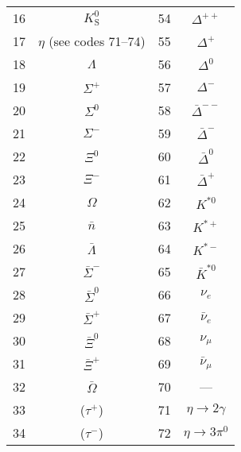 {\begin{table}[htb]
\begin{center}
\begin{tabular}{rc|rc}
       16 & $K^0_{\text{S}}$ &                       54 & $\Delta^{++}$ \\                         
       17 & $\eta$ (see codes 71--74) &              55 & $\Delta^+$ \\                            
       18 & $\Lambda$ &                              56 & $\Delta^0$ \\                            
       19 & $\Sigma^+$ &                             57 & $\Delta^-$ \\                            
       20 & $\Sigma^0$ &                             58 & $\bar{\Delta}^{--}$ \\                   
       21 & $\Sigma^-$ &                             59 & $\bar{\Delta}^-$ \\                      
       22 & $\Xi^0$ &                                60 & $\bar{\Delta}^0$ \\                      
       23 & $\Xi^-$ &                                61 & $\bar{\Delta}^+$ \\                      
       24 & $\Omega$ &                               62 & $K^{*0}$ \\                              
       25 & $\bar{n}$ &                              63 & $K^{*+}$ \\                              
       26 & $\bar{\Lambda}$ &                        64 & $K^{*-}$ \\                              
       27 & $\bar{\Sigma}^-$ &                       65 & $\bar{K}^{*0}$ \\                        
       28 & $\bar{\Sigma}^0$ &                       66 & $\nu_e$       \\                         
       29 & $\bar{\Sigma}^+$ &                       67 & $\bar{\nu}_e$ \\                         
       30 & $\bar{\Xi}^0$ &                          68 & $\nu_\mu$ \\                             
       31 & $\bar{\Xi}^+$ &                          69 & $\bar{\nu}_\mu$ \\                       
       32 & $\bar{\Omega}$ &                         70 & --- \\                                   
       33 & ($\tau^+$) &                             71 & $\eta \longrightarrow 2 \gamma$ \\       
       34 & ($\tau^-$) &                             72 & $\eta \longrightarrow 3 \pi^0$ \\        

\end{tabular}
\end{center}
\end{table}}
